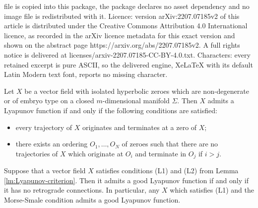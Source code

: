 \documentclass[10pt,a4paper]{amsart}
\begin{document}
file is copied into this package, the package declares no asset dependency and no image file is redistributed with it. Licence: version arXiv:2207.07185v2 of this article is distributed under the Creative Commons Attribution 4.0 International licence, as recorded in the arXiv licence metadata for this exact version and shown on the abstract page https://arxiv.org/abs/2207.07185v2. A full rights notice is delivered at licenses/arxiv-2207.07185-CC-BY-4.0.txt. Characters: every retained excerpt is pure ASCII, so the delivered engine, XeLaTeX with its default Latin Modern text font, reports no missing character.
\begin{lemma}\label{lm:Lyapunov-criterion}

 Let $X$ be a vector field  with isolated hyperbolic zeroes which are non-degenerate or of embryo type on a closed $m$-dimensional manifold $\Sigma$.
Then $X$ admits a Lyapunov function if and only if the following conditions are satisfied:
\begin{itemize}
\item[(L1)]   every trajectory of $X$ originates and terminates at a  zero of $X$;
\item[(L2)]  there exists an  ordering  $O_1,\dots, O_N$ of zeroes such that there are no trajectories of $X$ which originate at $O_i$ and terminate in $O_j$ if $i>j$.
\end{itemize}
\end{lemma}

 \begin{corollary}\label{cor:good-Lyapunov}
 Suppose that a vector field $X$ satisfies conditions (L1) and (L2) from   Lemma \ref{lm:Lyapunov-criterion}.  Then it admits a good Lyapunov function if and only if it  has no retrograde connections. In particular, any  $X$ which satisfies (L1) and the   Morse-Smale condition admits a good Lyapunov function. \end{corollary}
\end{document}
